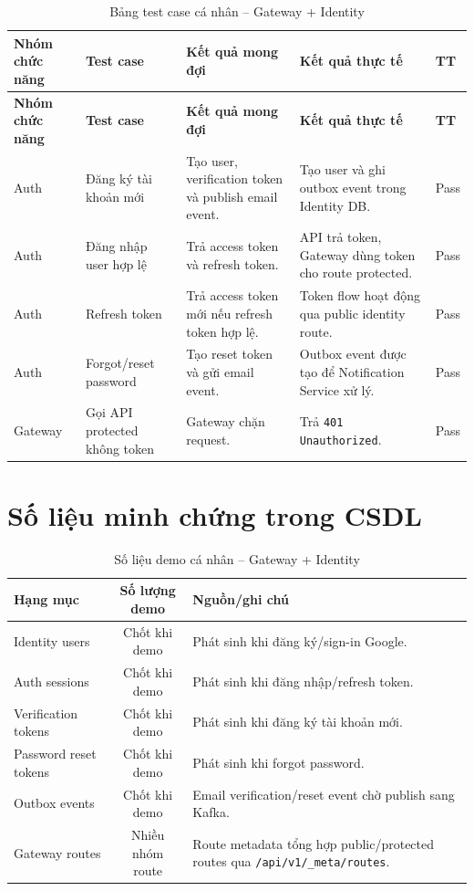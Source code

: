 \documentclass[14pt,a4paper,oneside]{extreport}
\begin{document}
\begin{longtable}{|p{2.8cm}|p{4.0cm}|p{4.3cm}|p{3.0cm}|p{1.6cm}|}
\caption{Bảng test case cá nhân -- Gateway + Identity}
\label{tab:test-case}\\
\hline
\textbf{Nhóm chức năng} & \textbf{Test case} & \textbf{Kết quả mong đợi} & \textbf{Kết quả thực tế} & \textbf{TT} \\
\hline
\endfirsthead
\hline
\textbf{Nhóm chức năng} & \textbf{Test case} & \textbf{Kết quả mong đợi} & \textbf{Kết quả thực tế} & \textbf{TT} \\
\hline
\endhead
Auth & Đăng ký tài khoản mới & Tạo user, verification token và publish email event. & Tạo user và ghi outbox event trong Identity DB. & Pass \\
\hline
Auth & Đăng nhập user hợp lệ & Trả access token và refresh token. & API trả token, Gateway dùng token cho route protected. & Pass \\
\hline
Auth & Refresh token & Trả access token mới nếu refresh token hợp lệ. & Token flow hoạt động qua public identity route. & Pass \\
\hline
Auth & Forgot/reset password & Tạo reset token và gửi email event. & Outbox event được tạo để Notification Service xử lý. & Pass \\
\hline
Gateway & Gọi API protected không token & Gateway chặn request. & Trả \texttt{401 Unauthorized}. & Pass \\
\hline
\end{longtable}

\section{Số liệu minh chứng trong CSDL}
\label{sec:so-lieu-minh-chung}

\begin{table}[H]
\centering
\caption{Số liệu demo cá nhân -- Gateway + Identity}
\label{tab:so-lieu-demo}
\renewcommand{\arraystretch}{1.3}
\small
\begin{tabularx}{\textwidth}{|l|c|X|}
\hline
\textbf{Hạng mục} & \textbf{Số lượng demo} & \textbf{Nguồn/ghi chú} \\
\hline
Identity users & Chốt khi demo & Phát sinh khi đăng ký/sign-in Google. \\
\hline
Auth sessions & Chốt khi demo & Phát sinh khi đăng nhập/refresh token. \\
\hline
Verification tokens & Chốt khi demo & Phát sinh khi đăng ký tài khoản mới. \\
\hline
Password reset tokens & Chốt khi demo & Phát sinh khi forgot password. \\
\hline
Outbox events & Chốt khi demo & Email verification/reset event chờ publish sang Kafka. \\
\hline
Gateway routes & Nhiều nhóm route & Route metadata tổng hợp public/protected routes qua \texttt{/api/v1/\_meta/routes}. \\
\hline
\end{tabularx}
\end{table}
\end{document}
